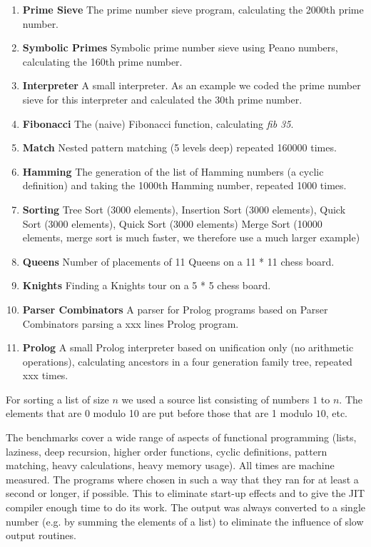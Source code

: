 \begin{enumerate}
\item {\bf Prime Sieve} The prime number sieve program, calculating the 2000th
prime number.
\item {\bf Symbolic Primes} Symbolic prime number sieve using Peano numbers,
calculating the 160th prime number.
\item {\bf Interpreter} A small \Sapl  interpreter. As an example we coded the prime
number sieve for this interpreter and calculated the 30th prime number.
\item {\bf Fibonacci} The (naive) Fibonacci function, calculating {\em fib 35}.
\item {\bf Match} Nested pattern matching (5 levels deep) repeated 160000 times.
\item {\bf Hamming} The generation of the list of Hamming numbers (a cyclic
definition) and taking the 1000th Hamming number, repeated 1000 times.
\item {\bf Sorting} Tree Sort (3000 elements), Insertion Sort (3000 elements), Quick Sort (3000 elements), Quick Sort (3000 elements) Merge
Sort (10000 elements, merge sort is much faster, we therefore use a much larger example)
\item {\bf Queens} Number of placements of 11 Queens on a 11 * 11 chess board.
\item {\bf Knights} Finding a Knights tour on a 5 * 5 chess board.
\item {\bf Parser Combinators} A parser for Prolog programs based on Parser
Combinators parsing a xxx lines Prolog program.
\item {\bf Prolog} A small Prolog interpreter based on unification only (no
arithmetic operations), calculating ancestors in a four generation family tree,
repeated xxx times.
\end{enumerate}
%
For sorting a list of size $n$ we used a source list consisting of numbers $1$
to $n$. The elements that are 0 modulo 10 are put before those that are 1 modulo
$10$, etc.

The benchmarks cover a wide range of aspects of functional programming (lists, laziness, 
deep recursion, higher order functions, cyclic definitions, pattern matching, 
heavy calculations, heavy memory usage).
All times are machine measured. The programs where chosen in such a way that
they ran for at least a second or longer, if possible. This to eliminate start-up 
effects and to give the JIT compiler enough time to do its work. 
The output was always converted to a single number (e.g. 
by summing the elements of a list) to eliminate the influence of slow output 
routines.

